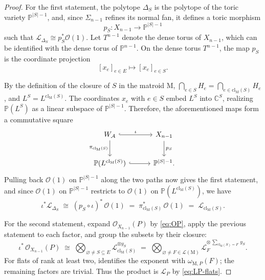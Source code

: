 \documentclass[11pt,a4paper,reqno]{amsart}
\theoremstyle{results}
\theoremstyle{definitions}
\def\C{\mathbb{C}}
\def\P{\mathbb{P}}
\def\calA{\mathcal{A}}
\def\calL{\mathcal{L}}
\newcommand{\abs}[1]{\left\lvert#1\right\rvert}
\newcommand{\cl}{\textrm{cl}}
\newcommand{\M}{\mathrm{M}}
\renewcommand{\emptyset}{\varnothing}
\newcommand{\cL}{\mathcal{L}}
\newcommand{\cO}{\mathcal{O}}
\begin{document}
\begin{proof}
  For the first statement, the polytope $\Delta_S$ is the polytope of the toric variety $\P^{|S|-1}$,
  and, since $\Sigma_{n-1}$ refines its normal fan, it defines a toric morphism
  \[
    p_{S} \colon X_{n-1} \longrightarrow \P^{|S|-1}
  \]
  such that $\cL_{\Delta_S} \cong p_S^{\ast}\cO(1)$.  Let $T^{n-1}$ denote the dense torus
  of $X_{n-1}$, which can be identified with the dense torus of $\P^{n-1}$.  On the dense torus $T^{n-1}$, the map $p_S$ is the coordinate projection
  \[
    [x_e]_{e \in E} \longmapsto [x_e]_{e \in S} .
  \]

  By the definition of the closure of $S$ in the matroid $\M$,
  $\bigcap_{e \in S} H_e = \bigcap_{e \in \cl_{\M}(S)} H_e$, and
  $L^{S} = L^{\cl_{\M}(S)}$.  The coordinates $x_e$ with $e \in S$ embed $L^{S}$
  into $\C^{S}$, realizing $\P(L^{S})$ as a linear subspace of $\P^{|S|-1}$.
  Therefore, the aforementioned maps form a commutative square
  \[
    \begin{tikzcd}[row sep=2.2em, column sep=3em]
      W_{\calA} \arrow[r, hook, "\iota"] \arrow[d, "\pi_{\cl_{\M}(S)}"'] & X_{n-1} \arrow[d, "p_S"] \\
      \P(L^{\cl_{\M}(S)}) \arrow[r, hook] & \P^{|S|-1}.
    \end{tikzcd}
  \]
  Pulling back $\cO(1)$ on $\P^{\abs{S}-1}$ along the two paths
  now gives the first statement, and since $\cO(1)$ on $\P^{\abs{S}-1}$ restricts to $\cO(1)$ on $\P(L^{\cl_{\M}(S)})$, we have
  \[
    \iota^{*}\cL_{\Delta_S} \;\cong\; (p_S \circ \iota)^{*}\,\cO(1)
    \;=\; \pi_{\cl_{\M}(S)}^{*}\,\cO(1) \;=\; \cL_{\cl_{\M}(S)} .
  \]

  For the second statement, expand $\cO_{X_{n-1}}(P)$ by \eqref{eq:OP}, apply the
  previous statement to each factor, and group the subsets by their closure:
  \[
    \iota^{*}\, \cO_{X_{n-1}}(P)
    \;\cong\;
    \bigotimes_{\emptyset \ne S \subseteq E} \cL_{\cl_{\M}(S)}^{\otimes y_S}
    \;=\;
    \bigotimes_{\emptyset \ne F \in \calL(\M)}
      \cL_{F}^{\otimes\, \sum_{\cl_{\M}(S) = F}\, y_S} .
  \]
  For flats of rank at least two,  identifies the
  exponent with $\omega_{\M,P}(F)$; the remaining factors are trivial. Thus
  the product is $\cL_P$ by \eqref{eq:LP-flats}.
\end{proof}
\end{document}
